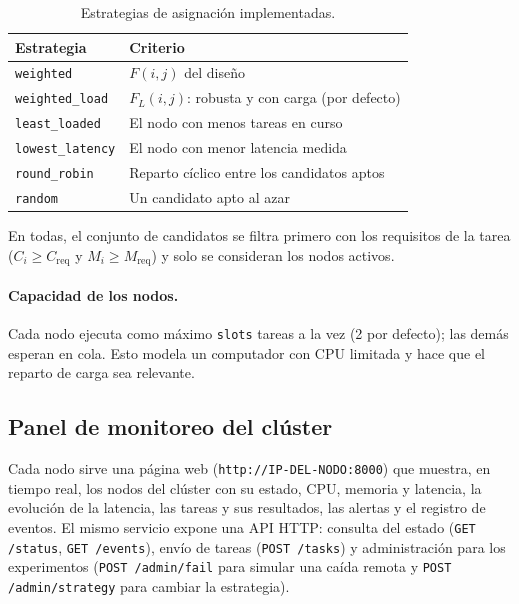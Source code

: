 \documentclass{article}
\begin{document}
\begin{table}[htbp]
\centering
\small
\begin{tabular}{|l|p{}|}
\hline
\textbf{Estrategia} & \textbf{Criterio} \\ \hline
\texttt{weighted} & $F(i,j)$ del diseño \\ \hline
\texttt{weighted\_load} & $F_L(i,j)$: robusta y con carga (por defecto) \\ \hline
\texttt{least\_loaded} & El nodo con menos tareas en curso \\ \hline
\texttt{lowest\_latency} & El nodo con menor latencia medida \\ \hline
\texttt{round\_robin} & Reparto cíclico entre los candidatos aptos \\ \hline
\texttt{random} & Un candidato apto al azar \\ \hline
\end{tabular}
\caption{Estrategias de asignación implementadas.}
\label{tab:estrategias-lista}
\end{table}

En todas, el conjunto de candidatos se filtra primero con los requisitos de la tarea
($C_i \geq C_{\mathrm{req}}$ y $M_i \geq M_{\mathrm{req}}$) y solo se consideran los nodos activos.

\paragraph{Capacidad de los nodos.}
Cada nodo ejecuta como máximo \texttt{slots} tareas a la vez (2 por defecto); las demás esperan en cola.
Esto modela un computador con CPU limitada y hace que el reparto de carga sea relevante.

\subsection{Panel de monitoreo del clúster}

Cada nodo sirve una página web (\texttt{http://IP-DEL-NODO:8000}) que muestra, en tiempo real, los
nodos del clúster con su estado, CPU, memoria y latencia, la evolución de la latencia, las tareas y sus
resultados, las alertas y el registro de eventos. El mismo servicio expone una API HTTP: consulta del
estado (\texttt{GET /status}, \texttt{GET /events}), envío de tareas (\texttt{POST /tasks}) y
administración para los experimentos (\texttt{POST /admin/fail} para simular una caída remota y
\texttt{POST /admin/strategy} para cambiar la estrategia).
\end{document}
